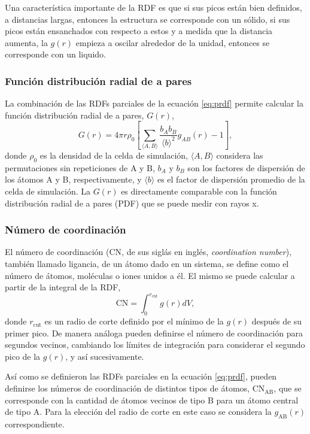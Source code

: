 Una característica importante de la RDF es que si sus picos están bien definidos,
a distancias largas, entonces la estructura se corresponde con un sólido, si sus 
picos están ensanchados con respecto a estos y a medida que la distancia aumenta, 
la $g(r)$ empieza a oscilar alrededor de la unidad, entonces se corresponde con 
un liquido.


\subsubsection{Función distribución radial de a pares}\label{ss:gofr}

La combinación de las RDFs parciales de la ecuación \ref{eq:prdf} permite
calcular la función distribución radial de a pares, $G(r)$, \cite{billinge2019}
\begin{equation}\label{eq:gofr}
    G(r) = 4 \pi r \rho_0 \left[\sum_{\langle A,B \rangle} \frac{b_A b_B}{\langle b\rangle^2} g_{AB}(r) - 1\right], 
\end{equation}
donde $\rho_0$ es la densidad de la celda de simulación, $\langle A, B \rangle$
considera las permutaciones sin repeticiones de A y B, $b_A$ y $b_B$ son los 
factores de dispersión de los átomos A y B, respectivamente, y $\langle b \rangle$
es el factor de dispersión promedio de la celda de simulación. La $G(r)$ es 
directamente comparable con la función distribución radial de a pares (PDF) que 
se puede medir con rayos x.


\subsubsection{Número de coordinación}\label{ss:cn}

El número de coordinación (CN, de sus siglás en inglés, \textit{coordination 
number}), también llamado ligancia, de un átomo dado en un sistema, se define 
como el número de átomos, moléculas o iones unidos a él. El mismo se puede 
calcular a partir de la integral de la RDF,
\begin{equation}\label{eq:cn}
    \text{CN} = \int_0^{r_{\text{cut}}} g(r) dV,
\end{equation}
donde $r_{\text{cut}}$ es un radio de corte definido por el mínimo de la $g(r)$
después de su primer pico. De manera análoga pueden definirse el número de 
coordinación para segundos vecinos, cambiando los límites de integración para 
considerar el segundo pico de la $g(r)$, y así sucesivamente.

Así como se definieron las RDFs parciales en la ecuación \ref{eq:prdf}, pueden 
definirse los números de coordinación de distintos tipos de átomos,
CN$_{\text{AB}}$, que se corresponde con la cantidad de átomos vecinos de tipo
B para un átomo central de tipo A. Para la elección del radio de corte en 
este caso se considera la $g_{\text{AB}}(r)$ correspondiente.

